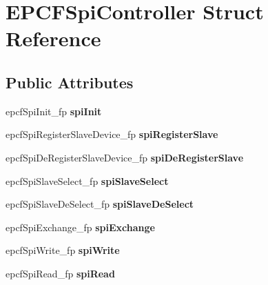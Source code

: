\hypertarget{structEPCFSpiController}{}\section{E\+P\+C\+F\+Spi\+Controller Struct Reference}
\label{structEPCFSpiController}
\subsection*{Public Attributes}
\begin{DoxyCompactItemize}
\item 
\mbox{\label{structEPCFSpiController_a1afaabe497a65b93d06d92dba51da6c5}} 
epcf\+Spi\+Init\+\_\+fp {\bfseries spi\+Init}
\item 
\mbox{\label{structEPCFSpiController_a36484d23942a6eec82ae2c01a106c4d4}} 
epcf\+Spi\+Register\+Slave\+Device\+\_\+fp {\bfseries spi\+Register\+Slave}
\item 
\mbox{\label{structEPCFSpiController_a95643fb5794ff9a7f349880c2ce3268c}} 
epcf\+Spi\+De\+Register\+Slave\+Device\+\_\+fp {\bfseries spi\+De\+Register\+Slave}
\item 
\mbox{\label{structEPCFSpiController_a3b88f99f515aaa47337a273aa2acde9d}} 
epcf\+Spi\+Slave\+Select\+\_\+fp {\bfseries spi\+Slave\+Select}
\item 
\mbox{\label{structEPCFSpiController_adb15c0baebbab1ed29c8aea3f1c74eaa}} 
epcf\+Spi\+Slave\+De\+Select\+\_\+fp {\bfseries spi\+Slave\+De\+Select}
\item 
\mbox{\label{structEPCFSpiController_ac9c5034d2e513f3299e050a6f55e834e}} 
epcf\+Spi\+Exchange\+\_\+fp {\bfseries spi\+Exchange}
\item 
\mbox{\label{structEPCFSpiController_a67368871c441f4a68ea3b45efd6a57b2}} 
epcf\+Spi\+Write\+\_\+fp {\bfseries spi\+Write}
\item 
\mbox{\label{structEPCFSpiController_ae94112c7c0e589c69d3e26d10ad2393d}} 
epcf\+Spi\+Read\+\_\+fp {\bfseries spi\+Read}

\end{DoxyCompactItemize}
